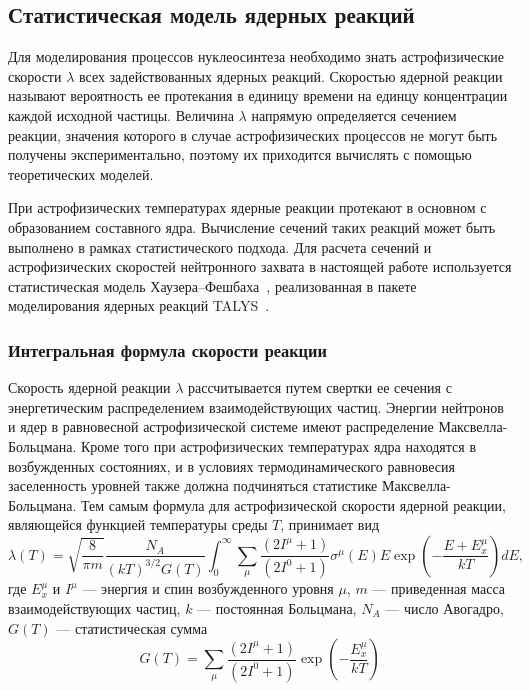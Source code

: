 \subsection{Статистическая модель ядерных реакций}
Для моделирования процессов нуклеосинтеза необходимо знать астрофизические скорости $\lambda$ всех задействованных ядерных реакций. Скоростью ядерной реакции называют вероятность ее протекания в единицу времени на единцу концентрации каждой исходной частицы. Величина $\lambda$ напрямую определяется сечением реакции, значения которого в случае астрофизических процессов не могут быть получены экспериментально, поэтому их приходится вычислять с помощью теоретических моделей.

При астрофизических температурах ядерные реакции протекают в основном с образованием составного ядра. Вычисление сечений таких реакций может быть выполнено в рамках статистического подхода. Для расчета сечений и астрофизических скоростей нейтронного захвата в настоящей работе используется статистическая модель Хаузера--Фешбаха~\cite{hauser1952}, реализованная в пакете моделирования ядерных реакций TALYS~\cite{koning2019}.

\subsubsection{Интегральная формула скорости реакции}
Скорость ядерной реакции $\lambda$ рассчитывается путем свертки ее сечения с энергетическим распределением взаимодействующих частиц. Энергии нейтронов и ядер в равновесной астрофизической системе имеют распределение Максвелла-Больцмана. Кроме того при астрофизических температурах ядра находятся в возбужденных состояниях, и в условиях термодинамического равновесия заселенность уровней также должна подчиняться статистике Максвелла-Больцмана. Тем самым формула для астрофизической скорости ядерной реакции, являющейся функцией температуры среды $T$, принимает вид
\begin{equation}
\displaystyle
\lambda(T) = \sqrt{\frac{8}{\pi m}} \frac{N_A}{(k T)^{3/2} G(T)} \int_0^\infty \sum_\mu \frac{(2 I^\mu + 1)}{(2 I^0 + 1)} \sigma^\mu(E) E \exp \left( - \frac{E + E_x^\mu}{kT} \right) dE,
\label{eq:rate}
\end{equation}
где $E^\mu_x$ и $I^\mu$ --- энергия и спин возбужденного уровня $\mu$, $m$ --- приведенная масса взаимодействующих частиц, $k$ --- постоянная Больцмана, $N_A$ --- число Авогадро, $G(T)$ --- статистическая сумма
\begin{equation}
    \displaystyle
    G(T) = \sum_\mu \frac{(2 I^\mu + 1)}{(2 I^0 + 1)} \exp \left( - \frac{E_x^\mu}{kT} \right)
\end{equation}

